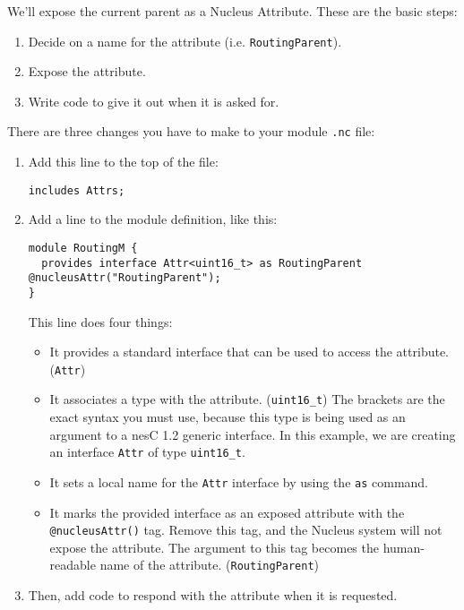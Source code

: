 \documentclass{article}
\begin{document}
We'll expose the current parent as a Nucleus Attribute. These are the
basic steps:

\begin{enumerate}
\item Decide on a name for the attribute (i.e. {\tt RoutingParent}).
\item Expose the attribute.
\item Write code to give it out when it is asked for.
\end{enumerate}

There are three changes you have to make to your module {\tt .nc}
file:

\begin{enumerate}
\item Add this line to the top of the file:
\begin{verbatim}
includes Attrs;
\end{verbatim}

\item 

Add a line to the module definition, like this:

\begin{verbatim}
module RoutingM {
  provides interface Attr<uint16_t> as RoutingParent @nucleusAttr("RoutingParent");
}
\end{verbatim}

This line does four things:

\begin{itemize}
\item It provides a standard interface that can be used to access the
attribute. ({\tt Attr})
\item It associates a type with the attribute. ({\tt uint16\_t}) The
  {\tt< >} brackets are the exact syntax you must use, because this
  type is being used as an argument to a nesC 1.2 generic
  interface. In this example, we are creating an interface {\tt Attr}
  of type {\tt uint16\_t}.
\item It sets a local name for the {\tt Attr} interface by using the
  {\tt as} command.
\item It marks the provided interface as an exposed attribute with the
{\tt @nucleusAttr()} tag. Remove this tag, and the Nucleus system will
not expose the attribute. The argument to this tag becomes the
human-readable name of the attribute. ({\tt RoutingParent})
\end{itemize}

\item Then, add code to respond with the attribute when it is
requested.


\end{enumerate}
\end{document}
